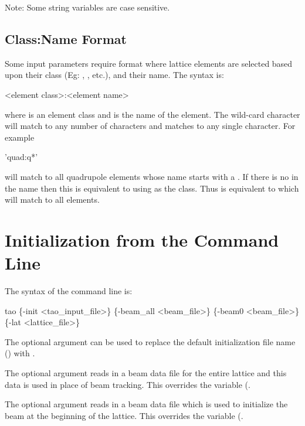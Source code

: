 Note: Some string variables are case sensitive.

\subsection{Class:Name Format}
\label{s:class:name}

Some input parameters require  format where lattice
elements are selected based upon their class (Eg: ,
, etc.), and their name. The syntax is:
\begin{example}
  <element class>:<element name>
\end{example}
where  is an element class and 
is the name of the element.  The wild-card character  will match
to any number of characters and  matches to any
single character.  For example
\begin{example}
  'quad:q*'
\end{example}
will match to all quadrupole elements whose name starts with a
. If there is no  in the name then this is equivalent
to using  as the class.  Thus  is equivalent to
 which will match to all elements.

\section{Initialization from the Command Line}
\label{s:command.line} 

The syntax of the command line is:
\begin{example}
  tao \{-init <tao_input_file>\} \{-beam_all <beam_file>\} 
                          \{-beam0 <beam_file>\} \{-lat <lattice_file>\}
\end{example}

The  optional argument can be used to replace the default
initialization file name () with .

The  optional argument reads in a beam data file for the
entire lattice and this data is used in place of beam tracking. This
overrides the  variable (.

The  optional argument reads in a beam data file which is
used to initialize the beam at the beginning of the lattice. This
overrides the  variable (.

